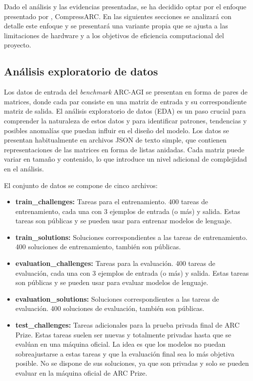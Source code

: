\documentclass[11pt,a4paper,spanish]{book}
\numberwithin{equation}{chapter}
\numberwithin{figure}{chapter}
\begin{document}
Dado el análisis y las evidencias presentadas, se ha decidido optar por el enfoque presentado por \citeauthor{liao2025arcagiwithoutpretraining}, CompressARC. En las siguientes
secciones se analizará con detalle este enfoque y se presentará una variante propia que se ajusta a las limitaciones de hardware y a los objetivos de eficiencia computacional del proyecto.

\subsection{Análisis exploratorio de datos}

Los datos de entrada del \textit{benchmark} ARC-AGI se presentan en forma de pares de matrices, donde cada par consiste en una matriz de entrada y su correspondiente matriz de salida.
El análisis exploratorio de datos (EDA) es un paso crucial para comprender la naturaleza de estos datos y para identificar patrones, tendencias y posibles anomalías que puedan influir en el diseño del modelo. Los
datos se presentan habitualmente en archivos JSON de texto simple, que contienen representaciones de las matrices en forma de listas anidadas. Cada matriz puede variar en tamaño y contenido,
lo que introduce un nivel adicional de complejidad en el análisis.

El conjunto de datos se compone de cinco archivos:

\begin{itemize}
	\item \textbf{train\_challenges:} Tareas para el entrenamiento. 400 tareas de entrenamiento, cada una con 3 ejemplos de entrada (o más) y salida. Estas tareas son públicas y se pueden usar para entrenar modelos de lenguaje.
	\item \textbf{train\_solutions:} Soluciones correspondientes a las tareas de entrenamiento. 400 soluciones de entrenamiento, también son públicas.
	\item \textbf{evaluation\_challenges:} Tareas para la evaluación. 400 tareas de evaluación, cada una con 3 ejemplos de entrada (o más) y salida. Estas tareas son públicas y se pueden usar para evaluar modelos de lenguaje.
	\item \textbf{evaluation\_solutions:} Soluciones correspondientes a las tareas de evaluación. 400 soluciones de evaluación, también son públicas.
	\item \textbf{test\_challenges:} Tareas adicionales para la prueba privada final de ARC Prize. Estas tareas suelen ser nuevas y totalmente privadas hasta que se evalúan en una máquina oficial. La idea es que los modelos no puedan sobreajustarse a estas tareas y que la evaluación final sea lo más objetiva posible. No se dispone de sus soluciones, ya que son privadas y solo se pueden evaluar en la máquina oficial de ARC Prize.
\end{itemize}
\end{document}

